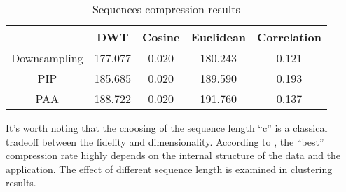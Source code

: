 \begin{table}[!htbp]
    \centering
    \hspace{0.5cm}
    \begin{tabular}{|c|c|c|c|c|}
        \hline
         & DWT & Cosine & Euclidean & Correlation \\ \hline
        Downsampling & 177.077 & 0.020 & 180.243 & 0.121 \\ \hline
        PIP & 185.685 & 0.020 & 189.590 & 0.193 \\ \hline
        PAA & 188.722 & 0.020 & 191.760 & 0.137 \\ \hline
    \end{tabular}
    \caption{Sequences compression results}
    \label{tab:compression1}
\end{table}
It's worth noting that the choosing of the sequence length ``c'' is a classical tradeoff between the fidelity and dimensionality. According to \cite{keogh2000scaling}, the ``best'' compression rate highly depends on the internal structure of the data and the application. The effect of different sequence length is examined in clustering results.


